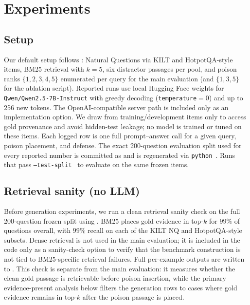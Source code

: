 \documentclass[11pt]{article}
\begin{document}
\section{Experiments}

\subsection{Setup}
Our default setup follows : Natural Questions via KILT and HotpotQA-style items, BM25 retrieval with $k=5$, six distractor passages per pool, and poison ranks $\{1,2,3,4,5\}$ enumerated per query for the main evaluation (and $\{1,3,5\}$ for the ablation script). Reported runs use local Hugging Face weights for \texttt{Qwen/Qwen2.5-7B-Instruct} with greedy decoding (\texttt{temperature}$=0$) and up to 256 new tokens. The OpenAI-compatible server path is included only as an implementation option. We draw from training/development items only to access gold provenance and avoid hidden-test leakage; no model is trained or tuned on these items. Each logged row is one full prompt--answer call for a given query, poison placement, and defense. The exact 200-question evaluation split used for every reported number is committed as  and is regenerated via \mbox{\texttt{python} }. Runs that pass \mbox{\texttt{--test-split} } to  evaluate on the same frozen items.

\subsection{Retrieval sanity (no LLM)}
Before generation experiments, we run a clean retrieval sanity check on the full 200-question frozen split using . BM25 places gold evidence in top-$k$ for $99\%$ of questions overall, with $99\%$ recall on each of the KILT NQ and HotpotQA-style subsets. Dense retrieval is not used in the main evaluation; it is included in the code only as a sanity-check option to verify that the benchmark construction is not tied to BM25-specific retrieval failures. Full per-example outputs are written to . This check is separate from the main evaluation: it measures whether the clean gold passage is retrievable before poison insertion, while the primary evidence-present analysis below filters the generation rows to cases where gold evidence remains in top-$k$ after the poison passage is placed.
\end{document}
